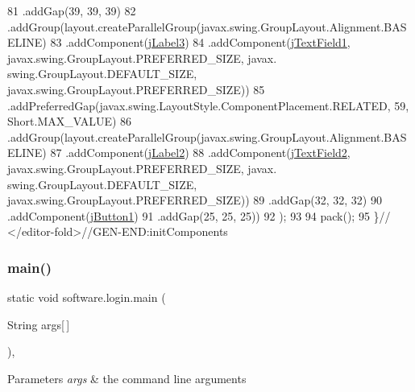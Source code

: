 \begin{DoxyCode}
81                 .addGap(39, 39, 39)
82                 .addGroup(layout.createParallelGroup(javax.swing.GroupLayout.Alignment.BASELINE)
83                     .addComponent(\mbox{\hyperlink{classsoftware_1_1login_a35cc02634a69b5d3cf15f9ad2a4892dd}{jLabel3}})
84                     .addComponent(\mbox{\hyperlink{classsoftware_1_1login_a690b80a1950fed323a4be5b825d60bce}{jTextField1}}, javax.swing.GroupLayout.PREFERRED\_SIZE, javax.
      swing.GroupLayout.DEFAULT\_SIZE, javax.swing.GroupLayout.PREFERRED\_SIZE))
85                 .addPreferredGap(javax.swing.LayoutStyle.ComponentPlacement.RELATED, 59, Short.MAX\_VALUE)
86                 .addGroup(layout.createParallelGroup(javax.swing.GroupLayout.Alignment.BASELINE)
87                     .addComponent(\mbox{\hyperlink{classsoftware_1_1login_a58160102e1811efcd53ef135c19909a5}{jLabel2}})
88                     .addComponent(\mbox{\hyperlink{classsoftware_1_1login_a4e1d1476f2bc1aed6116d7ffb239eb52}{jTextField2}}, javax.swing.GroupLayout.PREFERRED\_SIZE, javax.
      swing.GroupLayout.DEFAULT\_SIZE, javax.swing.GroupLayout.PREFERRED\_SIZE))
89                 .addGap(32, 32, 32)
90                 .addComponent(\mbox{\hyperlink{classsoftware_1_1login_a4dd489e2e09616f63d7fcbe94b4a6cd5}{jButton1}})
91                 .addGap(25, 25, 25))
92         );
93 
94         pack();
95     \}\textcolor{comment}{// </editor-fold>//GEN-END:initComponents}
\end{DoxyCode}
\mbox{\label{classsoftware_1_1login_a132b836b18cdd0a247477d646f9bb496}} 
\subsubsection{\texorpdfstring{main()}{main()}}
{\footnotesize\ttfamily static void software.\+login.\+main (\begin{DoxyParamCaption}\item[{String}]{args\mbox{[}$\,$\mbox{]} }\end{DoxyParamCaption})\hspace{0.3cm}{\ttfamily [inline]}, {\ttfamily [static]}}


\begin{DoxyParams}{Parameters}
{\em args} & the command line arguments \\
\hline
\end{DoxyParams}

